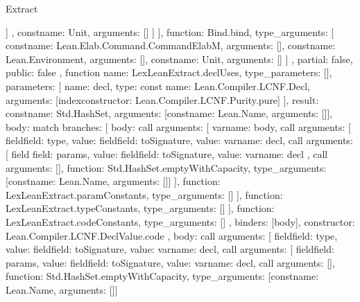\begin{lexlean}{Extract}
\begin{toolingmodule}
{{{{{{                  ]
                },
                const{name: Unit, arguments: []}
              ]
            }
          }
        ],
        function: Bind.bind,
        type_arguments: [
          const{name: Lean.Elab.Command.CommandElabM, arguments: []},
          const{name: Lean.Environment, arguments: []},
          const{name: Unit, arguments: []}
        ]
      },
      partial: false,
      public: false
    },
    function{
      name: LexLeanExtract.declUses,
      type_parameters: [],
      parameters: [
        {
          name: decl,
          type: const{
            name: Lean.Compiler.LCNF.Decl,
            arguments: [index{constructor: Lean.Compiler.LCNF.Purity.pure}]
          }
        }
      ],
      result: const{name: Std.HashSet, arguments: [const{name: Lean.Name, arguments: []}]},
      body: match{
        branches: [
          {
            body: call{
              arguments: [
                var{name: body},
                call{
                  arguments: [
                    field{field: type, value: field{field: toSignature, value: var{name: decl}}},
                    call{
                      arguments: [
                        field{
                          field: params,
                          value: field{field: toSignature, value: var{name: decl}}
                        },
                        call{
                          arguments: [],
                          function: Std.HashSet.emptyWithCapacity,
                          type_arguments: [const{name: Lean.Name, arguments: []}]
                        }
                      ],
                      function: LexLeanExtract.paramConstants,
                      type_arguments: []
                    }
                  ],
                  function: LexLeanExtract.typeConstants,
                  type_arguments: []
                }
              ],
              function: LexLeanExtract.codeConstants,
              type_arguments: []
            },
            binders: [body],
            constructor: Lean.Compiler.LCNF.DeclValue.code
          },
          {
            body: call{
              arguments: [
                field{field: type, value: field{field: toSignature, value: var{name: decl}}},
                call{
                  arguments: [
                    field{field: params, value: field{field: toSignature, value: var{name: decl}}},
                    call{
                      arguments: [],
                      function: Std.HashSet.emptyWithCapacity,
                      type_arguments: [const{name: Lean.Name, arguments: []}]
}}}}}}}
\end{toolingmodule}
\end{lexlean}
